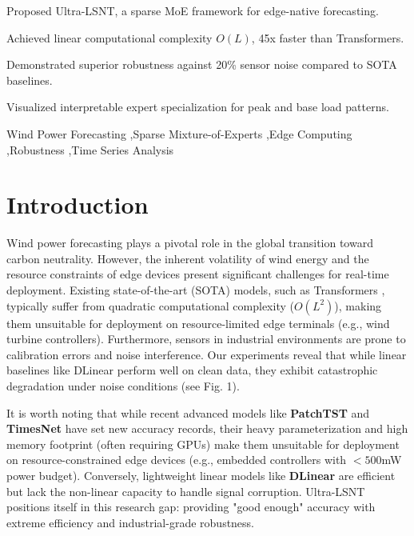 \documentclass[a4paper,fleqn]{cas-sc}
\begin{document}
\begin{highlights}
\item Proposed Ultra-LSNT, a sparse MoE framework for edge-native forecasting.
\item Achieved linear computational complexity $O(L)$, 45x faster than Transformers.
\item Demonstrated superior robustness against 20\% sensor noise compared to SOTA baselines.
\item Visualized interpretable expert specialization for peak and base load patterns.
\end{highlights}

\begin{keywords}
Wind Power Forecasting \sep Sparse Mixture-of-Experts \sep Edge Computing \sep Robustness \sep Time Series Analysis
\end{keywords}

\maketitle


\section{Introduction}
Wind power forecasting plays a pivotal role in the global transition toward carbon neutrality. However, the inherent volatility of wind energy and the resource constraints of edge devices present significant challenges for real-time deployment. Existing state-of-the-art (SOTA) models, such as Transformers \cite{transformer2017}, typically suffer from quadratic computational complexity ($O(L^2)$), making them unsuitable for deployment on resource-limited edge terminals (e.g., wind turbine controllers). Furthermore, sensors in industrial environments are prone to calibration errors and noise interference. Our experiments reveal that while linear baselines like DLinear perform well on clean data, they exhibit catastrophic degradation under noise conditions (see Fig. 1).

It is worth noting that while recent advanced models like \textbf{PatchTST} \cite{patchtst2023} and \textbf{TimesNet} have set new accuracy records, their heavy parameterization and high memory footprint (often requiring GPUs) make them unsuitable for deployment on resource-constrained edge devices (e.g., embedded controllers with $<500$mW power budget). Conversely, lightweight linear models like \textbf{DLinear} \cite{dlinear2023} are efficient but lack the non-linear capacity to handle signal corruption. Ultra-LSNT positions itself in this research gap: providing "good enough" accuracy with extreme efficiency and industrial-grade robustness.
\end{document}

